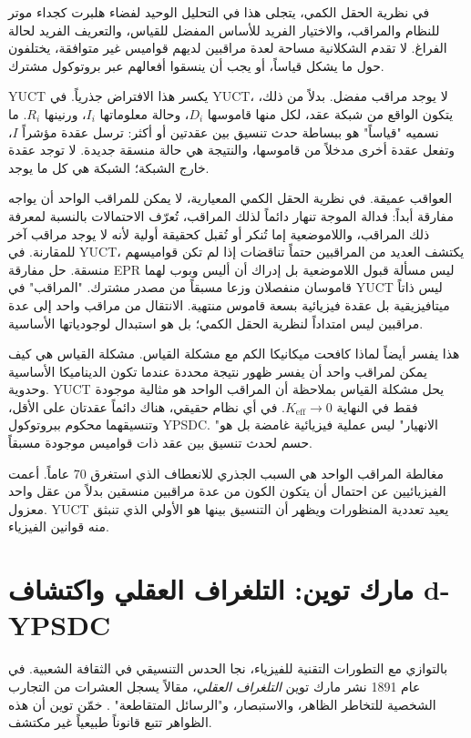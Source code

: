 \documentclass[12pt,a4paper]{article}
\begin{document}
	في نظرية الحقل الكمي، يتجلى هذا في التحليل الوحيد لفضاء هلبرت كجداء موتر للنظام والمراقب، والاختيار الفريد للأساس المفضل للقياس، والتعريف الفريد لحالة الفراغ. لا تقدم الشكلانية مساحة لعدة مراقبين لديهم قواميس غير متوافقة، يختلفون حول ما يشكل قياساً، أو يجب أن ينسقوا أفعالهم عبر بروتوكول مشترك.
	
	YUCT يكسر هذا الافتراض جذرياً. في YUCT، لا يوجد مراقب مفضل. بدلاً من ذلك، يتكون الواقع من شبكة عقد، لكل منها قاموسها \(D_i\)، وحالة معلوماتها \(I_i\)، ورنينها \(R_i\). ما نسميه "قياساً" هو ببساطة حدث تنسيق بين عقدتين أو أكثر: ترسل عقدة مؤشراً \(I\)، وتفعل عقدة أخرى مدخلاً من قاموسها، والنتيجة هي حالة منسقة جديدة. لا توجد عقدة خارج الشبكة؛ الشبكة هي كل ما يوجد.
	
	العواقب عميقة. في نظرية الحقل الكمي المعيارية، لا يمكن للمراقب الواحد أن يواجه مفارقة أبداً: فدالة الموجة تنهار دائماً لذلك المراقب، تُعرّف الاحتمالات بالنسبة لمعرفة ذلك المراقب، واللاموضعية إما تُنكر أو تُقبل كحقيقة أولية لأنه لا يوجد مراقب آخر للمقارنة. في YUCT، يكتشف العديد من المراقبين حتماً تناقضات إذا لم تكن قواميسهم منسقة. حل مفارقة EPR ليس مسألة قبول اللاموضعية بل إدراك أن أليس وبوب لهما قاموسان منفصلان وزعا مسبقاً من مصدر مشترك. "المراقب" في YUCT ليس ذاتاً ميتافيزيقية بل عقدة فيزيائية بسعة قاموس منتهية. الانتقال من مراقب واحد إلى عدة مراقبين ليس امتداداً لنظرية الحقل الكمي؛ بل هو استبدال لوجودياتها الأساسية.
	
	هذا يفسر أيضاً لماذا كافحت ميكانيكا الكم مع مشكلة القياس. مشكلة القياس هي كيف يمكن لمراقب واحد أن يفسر ظهور نتيجة محددة عندما تكون الديناميكا الأساسية وحدوية. YUCT يحل مشكلة القياس بملاحظة أن المراقب الواحد هو مثالية موجودة فقط في النهاية \(K_{\mathrm{eff}} \to 0\). في أي نظام حقيقي، هناك دائماً عقدتان على الأقل، وتنسيقهما محكوم ببروتوكول YPSDC. "الانهيار" ليس عملية فيزيائية غامضة بل هو حسم لحدث تنسيق بين عقد ذات قواميس موجودة مسبقاً.
	
	مغالطة المراقب الواحد هي السبب الجذري للانعطاف الذي استغرق 70 عاماً. أعمت الفيزيائيين عن احتمال أن يتكون الكون من عدة مراقبين منسقين بدلاً من عقل واحد معزول. YUCT يعيد تعددية المنظورات ويظهر أن التنسيق بينها هو الأولي الذي تنبثق منه قوانين الفيزياء.
	
	\section{مارك توين: التلغراف العقلي واكتشاف d-YPSDC}
	
	بالتوازي مع التطورات التقنية للفيزياء، نجا الحدس التنسيقي في الثقافة الشعبية. في عام 1891 نشر مارك توين \emph{التلغراف العقلي}، مقالاً يسجل العشرات من التجارب الشخصية للتخاطر الظاهر، والاستبصار، و"الرسائل المتقاطعة" \cite{Twain1891}. خمّن توين أن هذه الظواهر تتبع قانوناً طبيعياً غير مكتشف.
	
\end{document}
